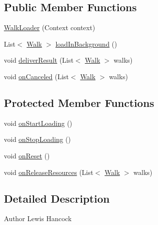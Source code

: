 \subsection*{Public Member Functions}
\begin{DoxyCompactItemize}
\item 
\hyperlink{classuk_1_1ac_1_1swan_1_1digitaltrails_1_1sync_1_1_walk_loader_a819510c5c7225df9050346b421a0875d}{Walk\+Loader} (Context context)
\item 
List$<$ \hyperlink{classuk_1_1ac_1_1swan_1_1digitaltrails_1_1components_1_1_walk}{Walk} $>$ \hyperlink{classuk_1_1ac_1_1swan_1_1digitaltrails_1_1sync_1_1_walk_loader_ab3d165cd6a205be4b4be3d0196f82a2f}{load\+In\+Background} ()
\item 
void \hyperlink{classuk_1_1ac_1_1swan_1_1digitaltrails_1_1sync_1_1_walk_loader_a8587e0e55cac69b0ea2b7c0e247c560a}{deliver\+Result} (List$<$ \hyperlink{classuk_1_1ac_1_1swan_1_1digitaltrails_1_1components_1_1_walk}{Walk} $>$ walks)
\item 
void \hyperlink{classuk_1_1ac_1_1swan_1_1digitaltrails_1_1sync_1_1_walk_loader_add9c65d109a847025442f3a8d6c9c578}{on\+Canceled} (List$<$ \hyperlink{classuk_1_1ac_1_1swan_1_1digitaltrails_1_1components_1_1_walk}{Walk} $>$ walks)
\end{DoxyCompactItemize}
\subsection*{Protected Member Functions}
\begin{DoxyCompactItemize}
\item 
void \hyperlink{classuk_1_1ac_1_1swan_1_1digitaltrails_1_1sync_1_1_walk_loader_aa45381e4d22f376794110d36e6255dbe}{on\+Start\+Loading} ()
\item 
void \hyperlink{classuk_1_1ac_1_1swan_1_1digitaltrails_1_1sync_1_1_walk_loader_aa7af819c0f973cad6b08e4a8421559ea}{on\+Stop\+Loading} ()
\item 
void \hyperlink{classuk_1_1ac_1_1swan_1_1digitaltrails_1_1sync_1_1_walk_loader_a4128676b76295beb82484cbb839650d4}{on\+Reset} ()
\item 
void \hyperlink{classuk_1_1ac_1_1swan_1_1digitaltrails_1_1sync_1_1_walk_loader_a0ff848242b7ab72e395edd6b7f71bb6c}{on\+Release\+Resources} (List$<$ \hyperlink{classuk_1_1ac_1_1swan_1_1digitaltrails_1_1components_1_1_walk}{Walk} $>$ walks)
\end{DoxyCompactItemize}


\subsection{Detailed Description}
\begin{DoxyAuthor}{Author}
Lewis Hancock 
\end{DoxyAuthor}


